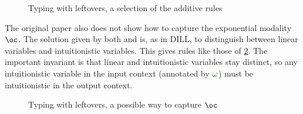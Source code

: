 \begin{figure}
  \caption{Typing with leftovers, a selection of the additive rules}
  \label{fig:twl-add}
\end{figure}

The original paper also does not show how to capture the exponential modality
$\oc$.
The solution given by both \citet{WH94} and \citet{CHP00} is, as in DILL, to
distinguish between linear variables and intuitionistic variables.
This gives rules like those of \cref{fig:twl-exp}.
The important invariant is that linear and intuitionistic variables stay
distinct, so any intuitionistic variable in the input context (annotated by
$\gr\omega$) must be intuitionistic in the output context.

\begin{figure}
  \caption{Typing with leftovers, a possible way to capture $\oc$}
  \label{fig:twl-exp}
\end{figure}

